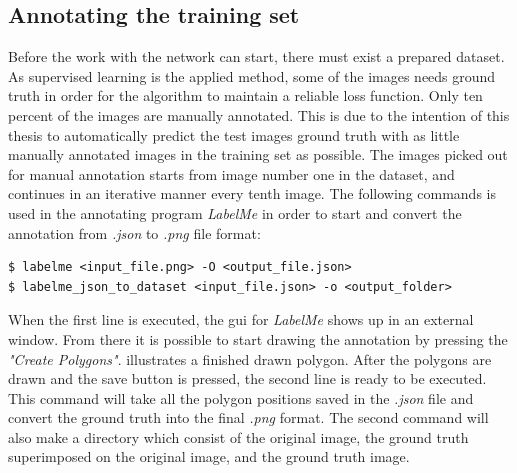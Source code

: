 \documentclass[USenglish]{ifimaster}  %
\begin{document}
\subsection{Annotating the training set}
Before the work with the network can start, there must exist a prepared dataset. As supervised learning is the applied method, some of the images needs ground truth in order for the algorithm to maintain a reliable loss function. Only ten percent of the images are manually annotated. This is due to the intention of this thesis to automatically predict the test images ground truth with as little manually annotated images in the training set as possible. The images picked out for manual annotation starts from image number one in the dataset, and continues in an iterative manner every tenth image. The following commands is used in the annotating program \textit{LabelMe} in order to start and convert the annotation from \textit{.json} to \textit{.png} file format:   

\begin{verbatim}
$ labelme <input_file.png> -O <output_file.json>
$ labelme_json_to_dataset <input_file.json> -o <output_folder>
\end{verbatim}

When the first line is executed, the \ac{gui} for \textit{LabelMe} shows up in an external window. From there it is possible to start drawing the annotation by pressing the \textit{"Create Polygons"}.  illustrates a finished drawn polygon. After the polygons are drawn and the save button is pressed, the second line is ready to be executed. This command will take all the polygon positions saved in the \textit{.json} file and convert the ground truth into the final \textit{.png} format. The second command will also make a directory which consist of the original image, the ground truth superimposed on the original image, and the ground truth image. 
\end{document}
